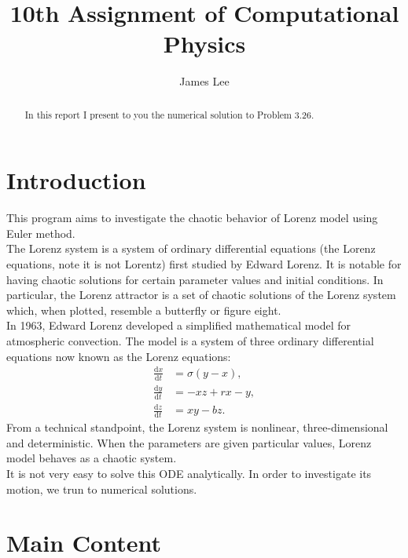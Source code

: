 \documentclass[10pt,a4paper]{article}
\author{James Lee}
\title{10th Assignment of Computational Physics}
\begin{document}
	\maketitle
	\begin{abstract}
		In this report I present to you the numerical solution to Problem 3.26.
	\end{abstract}
	\section{Introduction}
	This program aims to investigate the chaotic behavior of Lorenz model using Euler method.\\
	The Lorenz system is a system of ordinary differential equations (the Lorenz equations, note it is not Lorentz) first studied by Edward Lorenz. It is notable for having chaotic solutions for certain parameter values and initial conditions. In particular, the Lorenz attractor is a set of chaotic solutions of the Lorenz system which, when plotted, resemble a butterfly or figure eight.\\
	In 1963, Edward Lorenz developed a simplified mathematical model for atmospheric convection. The model is a system of three ordinary differential equations now known as the Lorenz equations:
	\begin{align}
		\frac{\mathrm{d}x}{\mathrm{d}t} &= \sigma (y - x), \\
		\frac{\mathrm{d}y}{\mathrm{d}t} &= -xz+rx - y, \\
		\frac{\mathrm{d}z}{\mathrm{d}t} &= x y - bz.
	\end{align} 
	From a technical standpoint, the Lorenz system is nonlinear, three-dimensional and deterministic. When the parameters are given particular values, Lorenz model behaves as a chaotic system.\\
	It is not very easy to solve this ODE analytically. In order to investigate its motion, we trun to numerical solutions.
	
    \section{Main Content}
\end{document}
